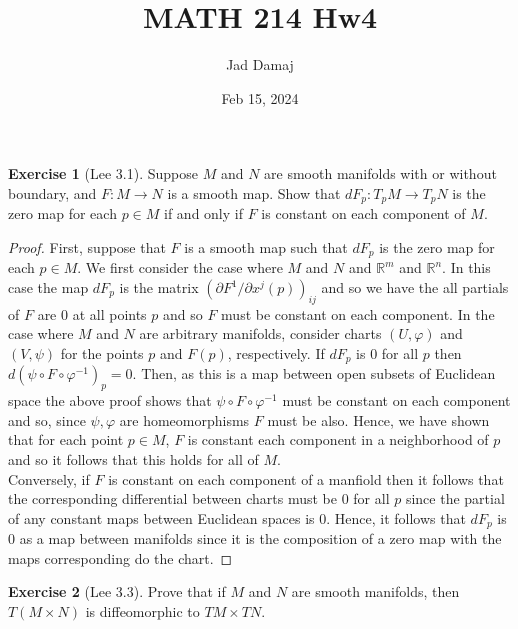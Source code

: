 \documentclass{article}
\title{MATH 214 Hw4}
\author{Jad Damaj}
\date{Feb 15, 2024}
\newcommand{\bR}{\mathbb{R}}
\newcommand{\vp}{\varphi}
\theoremstyle{definition}
\newtheorem{exercise}{Exercise}
\begin{document}
\maketitle

\begin{exercise}[Lee 3.1]
    Suppose $M$ and $N$ are smooth manifolds with or without boundary, and $F: M \to N$ is a smooth map. Show that $dF_p: T_p M \to T_p N$ is the zero map for each $p \in M$ if and only if $F$ is constant on each component of $M$. 
\end{exercise}

\begin{proof}
    First, suppose that $F$ is a smooth map such that $dF_p$ is the zero map for each $p \in M$. We first consider the case where $M$ and $N$ and $\bR^m$ and $\bR^n$. In this case the map $dF_p$ is the matrix $( \partial F^1/ \partial x^j(p))_{ij}$ and so we have the all partials of $F$ are 0 at all points $p$ and so $F$ must be constant on each component. In the case where $M$ and $N$ are arbitrary manifolds, consider charts $(U, \vp)$ and $(V, \psi)$ for the points $p$ and $F(p)$, respectively. If $dF_p$ is 0 for all $p$ then $d(\psi \circ F\circ \vp^{-1})_p = 0$. Then, as this is a map between open subsets of Euclidean space the above proof shows that $\psi \circ F \circ \vp^{-1}$ must be constant on each component and so, since $\psi, \vp$ are homeomorphisms $F$ must be also. Hence, we have shown that for each point $p \in M$, $F$ is constant each component in a neighborhood of $p$ and so it follows that this holds for all of $M$. \\
    Conversely, if $F$ is constant on each component of a manfiold then it follows that the corresponding differential between charts must be 0 for all $p$ since the partial of any constant maps between Euclidean spaces is 0. Hence, it follows that $dF_p$ is 0 as a map between manifolds since it is the composition of a zero map with the maps corresponding do the chart. 
\end{proof}

\begin{exercise}[Lee 3.3]
    Prove that if $M$ and $N$ are smooth manifolds, then $T(M \times N)$ is diffeomorphic to $TM \times TN$. 
\end{exercise}
\end{document}
